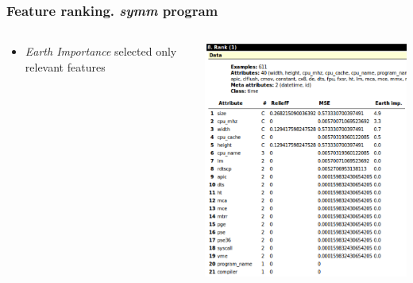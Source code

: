 \documentclass{beamer}
\begin{document}
\begin{frame}
\frametitle{Feature ranking. \textit{symm} program}

	\begin{columns}
		\begin{column}{0.5\textwidth}
			\begin{itemize}
				\item \textit{Earth Importance} selected only relevant features
			\end{itemize}
		\end{column}
		\begin{column}{0.5\textwidth}
			\includegraphics[scale=0.375]{feature-ranking}
		\end{column}	
	\end{columns}
	
\end{frame}
\end{document}
